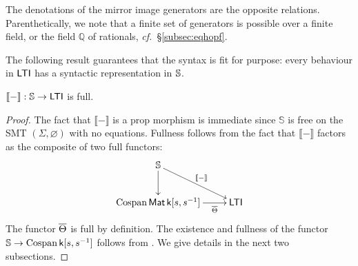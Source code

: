 \noindent 
The denotations of the mirror image generators are the opposite relations.
Parenthetically, we note that a finite set of generators is possible
over a finite field, or the field $\mathbb{Q}$ of rationals, \emph{cf.}\
\S\ref{subsec:eqhopf}.

The following result guarantees that the syntax is fit for purpose: every
behaviour in $\operatorname{\mathsf{LTI}}$ has a syntactic representation in $\mathbb{S}$.
\begin{proposition}\label{prop.syntaxfull}
  $\llbracket - \rrbracket: \mathbb{S}\to\operatorname{\mathsf{LTI}}$ is full.
\end{proposition}
\begin{proof}
  The fact that $\llbracket - \rrbracket$ is a prop morphism is immediate since
  $\mathbb{S}$ is free on the SMT $(\Sigma,\varnothing)$ with no
  equations.  Fullness follows from the fact that $\llbracket - \rrbracket$
  factors as the composite of two full functors:
  \[
    \xymatrixrowsep{2pc}
    \xymatrix{
      \syntax \ar[d] \ar[dr]^{\llbracket-\rrbracket} \\
      \cospan\mat\pk \ar[r]_-{\cospanfunrest} & \ltids
    }
  \]
  The functor $\overline{\Theta}$ is full by definition. The existence and fullness
  of the functor $\mathbb{S}\to\operatorname{{Cospan}}{\mathsf{k}[s,s^{-1}]}$ follows from \cite[Th. 3.41]{Za}. We
  give details in the next two subsections.
\end{proof}

